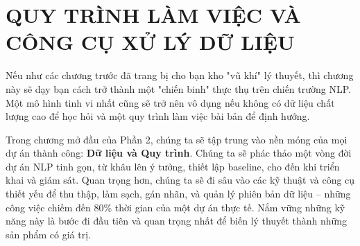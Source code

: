 \chapter{QUY TRÌNH LÀM VIỆC VÀ CÔNG CỤ XỬ LÝ DỮ LIỆU}
\label{chap:workflow_data}

Nếu như các chương trước đã trang bị cho bạn kho "vũ khí" lý thuyết, thì chương này sẽ dạy bạn cách trở thành một "chiến binh" thực thụ trên chiến trường NLP. Một mô hình tinh vi nhất cũng sẽ trở nên vô dụng nếu không có dữ liệu chất lượng cao để học hỏi và một quy trình làm việc bài bản để định hướng.

Trong chương mở đầu của Phần 2, chúng ta sẽ tập trung vào nền móng của mọi dự án thành công: \textbf{Dữ liệu và Quy trình}. Chúng ta sẽ phác thảo một vòng đời dự án NLP tinh gọn, từ khâu lên ý tưởng, thiết lập baseline, cho đến khi triển khai và giám sát. Quan trọng hơn, chúng ta sẽ đi sâu vào các kỹ thuật và công cụ thiết yếu để thu thập, làm sạch, gán nhãn, và quản lý phiên bản dữ liệu -- những công việc chiếm đến 80\% thời gian của một dự án thực tế. Nắm vững những kỹ năng này là bước đi đầu tiên và quan trọng nhất để biến lý thuyết thành những sản phẩm có giá trị.
